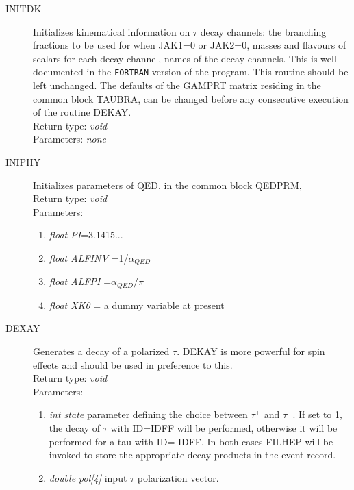 \documentclass[]{Tauola_interface_design}
\begin{document}
\begin{description}
\item[INITDK] Initializes kinematical information on $\tau$ decay channels: 
the branching fractions to be used for when JAK1=0 or JAK2=0, masses and flavours of scalars
for each decay channel, names of the decay channels. This is well documented
in the  {\tt FORTRAN} version of the program. This routine should be left unchanged.
The defaults of the GAMPRT matrix residing in the common block TAUBRA, can be changed
before any consecutive execution of the routine DEKAY.
 \\
  Return type: \textit{void} \\
  Parameters: \textit{none}
\end{description}

\begin{description}
\item[INIPHY]  Initializes parameters of QED, in the common block QEDPRM, \\
  Return type: \textit{void} \\
  Parameters:
  \begin{enumerate}
    \item \textit {float PI}=3.1415...
    \item \textit {float ALFINV }=1/$\alpha_{QED}$
    \item \textit {float ALFPI }=$\alpha_{QED}/\pi$
    \item \textit {float XK0} = a dummy variable at present
  \end{enumerate}
\end{description}

\begin{description}
\item[DEXAY] Generates a decay of a polarized  $\tau$. DEKAY is more powerful for
  spin effects and should be used in preference to this.\\
  Return type: \textit{void} \\
  Parameters:
  \begin{enumerate}
    \item \textit {int state} parameter defining the choice between $\tau^+$ and $\tau^-$. If set to 1, the decay of $\tau$
with ID=IDFF will be performed, otherwise it will be performed for a tau with ID=-IDFF. In both cases FILHEP will be invoked to store 
the appropriate decay products in the event record.

    \item \textit {double pol[4]} input $\tau$ polarization vector.
  \end{enumerate}
\end{description}
\end{document}
